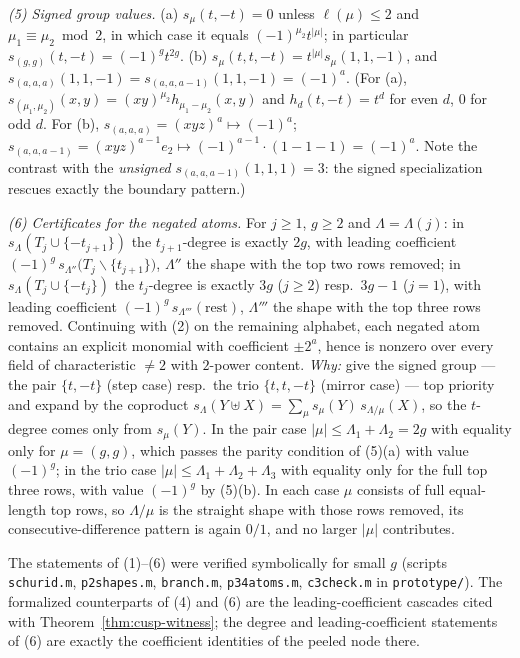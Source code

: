 \begin{remark}
\emph{(5) Signed group values.}
(a) $s_\mu(t, -t) = 0$ unless $\ell(\mu) \le 2$ and $\mu_1 \equiv \mu_2 \bmod 2$, in
which case it equals $(-1)^{\mu_2} t^{|\mu|}$; in particular
$s_{(g,g)}(t,-t) = (-1)^g t^{2g}$.
(b) $s_\mu(t, t, -t) = t^{|\mu|} s_\mu(1,1,-1)$, and
$s_{(a,a,a)}(1,1,-1) = s_{(a,a,a-1)}(1,1,-1) = (-1)^a$.
(For (a), $s_{(\mu_1,\mu_2)}(x,y) = (xy)^{\mu_2} h_{\mu_1-\mu_2}(x,y)$ and
$h_d(t,-t) = t^d$ for even $d$, $0$ for odd $d$. For (b),
$s_{(a,a,a)} = (xyz)^a \mapsto (-1)^a$;
$s_{(a,a,a-1)} = (xyz)^{a-1} e_2 \mapsto (-1)^{a-1}\cdot(1 - 1 - 1) = (-1)^a$. Note the
contrast with the \emph{unsigned} $s_{(a,a,a-1)}(1,1,1) = 3$: the signed specialization
rescues exactly the boundary pattern.)

\emph{(6) Certificates for the negated atoms.}
For $j \ge 1$, $g \ge 2$ and $\Lambda = \Lambda(j)$:
in $s_{\Lambda}(T_j \cup \{-t_{j+1}\})$ the $t_{j+1}$-degree is exactly $2g$, with
leading coefficient $(-1)^g\, s_{\Lambda''}\bigl(T_j \smallsetminus \{t_{j+1}\}\bigr)$,
$\Lambda''$ the shape with the top two rows removed; in
$s_{\Lambda}(T_j \cup \{-t_j\})$ the $t_j$-degree is exactly $3g$ ($j \ge 2$) resp.\
$3g - 1$ ($j = 1$), with leading coefficient $(-1)^g\, s_{\Lambda'''}(\text{rest})$,
$\Lambda'''$ the shape with the top three rows removed. Continuing with (2) on the
remaining alphabet, each negated atom contains an explicit monomial with coefficient
$\pm 2^a$, hence is nonzero over every field of characteristic $\neq 2$ with $2$-power
content. \emph{Why:} give the signed group --- the pair $\{t, -t\}$ (step case) resp.\
the trio $\{t, t, -t\}$ (mirror case) --- top priority and expand by the coproduct
$s_\Lambda(Y \uplus X) = \sum_\mu s_\mu(Y)\, s_{\Lambda/\mu}(X)$, so the $t$-degree
comes only from $s_\mu(Y)$. In the pair case
$|\mu| \le \Lambda_1 + \Lambda_2 = 2g$ with equality only for $\mu = (g,g)$, which
passes the parity condition of (5)(a) with value $(-1)^g$; in the trio case
$|\mu| \le \Lambda_1 + \Lambda_2 + \Lambda_3$ with equality only for the full top three
rows, with value $(-1)^g$ by (5)(b). In each case $\mu$ consists of full equal-length
top rows, so $\Lambda/\mu$ is the straight shape with those rows removed, its
consecutive-difference pattern is again $0/1$, and no larger $|\mu|$ contributes.

The statements of (1)--(6) were verified symbolically for small $g$ (scripts
\texttt{schurid.m}, \texttt{p2shapes.m}, \texttt{branch.m}, \texttt{p34atoms.m},
\texttt{c3check.m} in \texttt{prototype/}). The formalized counterparts of (4) and (6)
are the leading-coefficient cascades cited with Theorem~\ref{thm:cusp-witness}; the
degree and leading-coefficient statements of (6) are exactly the coefficient identities
of the peeled node there.
\end{remark}

